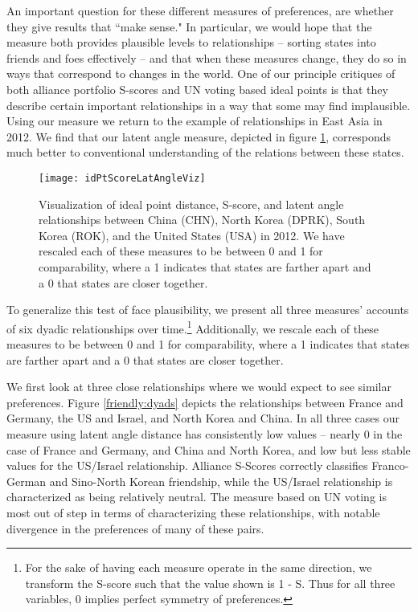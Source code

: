 An important question for these different measures of preferences, are whether they give results that ``make sense." In particular, we would hope that the measure both provides plausible levels to relationships -- sorting states into friends and foes effectively -- and that when these measures change, they do so in ways that correspond to changes in the world. One of our principle critiques of both alliance portfolio S-scores and UN voting based ideal points is that they describe certain important relationships in a way that some may find implausible. Using our measure we return to the example of relationships in East Asia in 2012. We find that our latent angle measure, depicted in figure \ref{korea:withus}, corresponds much better to conventional understanding of the relations between these states.

\begin{figure}[ht]
\texttt{[image: idPtScoreLatAngleViz]}
\caption{Visualization of ideal point distance, S-score, and latent angle relationships between China (CHN), North Korea (DPRK), South Korea (ROK), and the United States (USA) in 2012. We have rescaled each of these measures to be between 0 and 1 for comparability, where a 1 indicates that states are farther apart and a 0 that states are closer together.}
\label{korea:withus}
\end{figure}

To generalize this test of face plausibility, we present all three measures' accounts of six dyadic relationships over time.\footnote{For the sake of having each measure operate in the same direction, we transform the S-score such that the value shown is 1 - S. Thus for all three variables, $0$ implies perfect symmetry of preferences.} Additionally, we rescale each of these measures to be between 0 and 1 for comparability, where a 1 indicates that states are farther apart and a 0 that states are closer together.

We first look at three close relationships where we would expect to see similar preferences. Figure \ref{friendly:dyads} depicts the relationships between France and Germany, the US and Israel, and North Korea and China. In all three cases our measure using latent angle distance has consistently low values -- nearly $0$ in the case of France and Germany, and China and North Korea, and low but less stable values for the US/Israel relationship. Alliance S-Scores correctly classifies Franco-German and Sino-North Korean friendship, while the US/Israel relationship is characterized as being relatively neutral. The measure based on UN voting is most out of step in terms of characterizing these relationships, with notable divergence in the preferences of many of these pairs.

